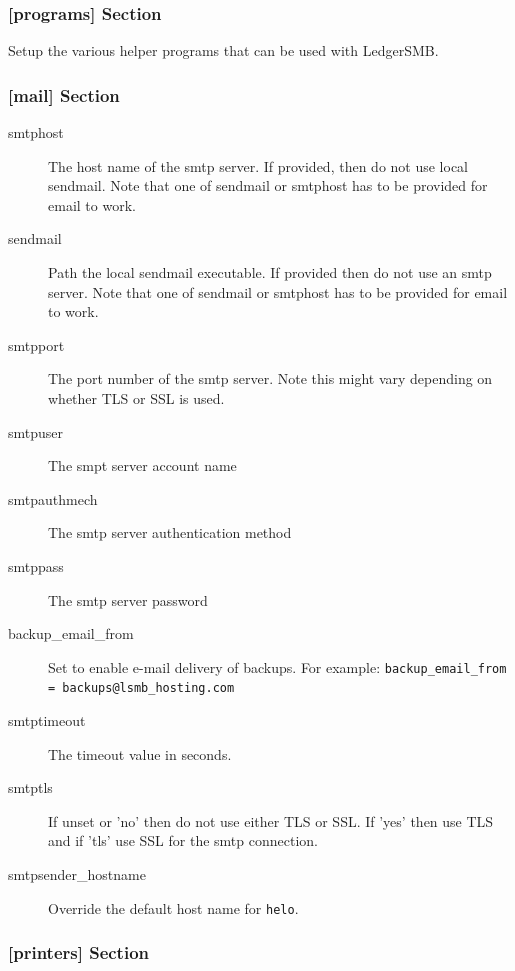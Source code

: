 \subsubsection{[programs] Section}
\label{subsubsec-global-config-ledgersmb-conf-programs}

Setup the various helper programs that can be used with LedgerSMB.

\subsubsection{[mail] Section}
\label{subsubsec-global-config-ledgersmb-conf-mail}

\begin{description}
        \item [smtphost] The host name of the smtp server. If provided, then do not use local sendmail. Note that one of sendmail or smtphost has to be provided for email to work.
        \item [sendmail] Path the local sendmail executable. If provided then do not use an smtp server. Note that one of sendmail or smtphost has to be provided for email to work.
        \item [smtpport] The port number of the smtp server. Note this might vary depending on whether TLS or SSL is used.
        \item [smtpuser] The smpt server account name
        \item [smtpauthmech] The smtp server authentication method
        \item [smtppass] The smtp server password
        \item [backup\_email\_from] Set to enable e-mail delivery of backups. For example:
        \texttt{backup\_email\_from = backups@lsmb\_hosting.com}
        \item [smtptimeout] The timeout value in seconds.

        \item [smtptls] If unset or 'no' then do not use either TLS or SSL. If 'yes' then use TLS and if 'tls' use SSL for the smtp connection.

        \item [smtpsender\_hostname] Override the default host name for \texttt{helo}.
\end{description}

\subsubsection{[printers] Section}
\label{subsubsec-global-config-ledgersmb-conf-printers}

